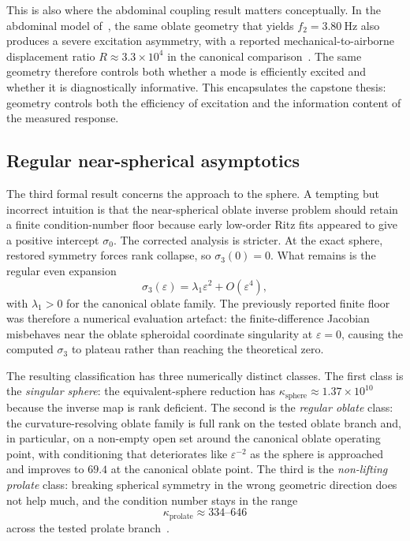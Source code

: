 This is also where the abdominal coupling result matters conceptually.  In the
abdominal model of~\cite{BrowntoneP1}, the same oblate geometry that yields
$f_2=\SI{3.80}{\hertz}$ also produces a severe excitation asymmetry, with a
reported mechanical-to-airborne displacement ratio
$R \approx 3.3\times 10^4$ in the canonical comparison~\cite{BrowntoneP1}.  The
same geometry therefore controls both whether a mode is efficiently excited and
whether it is diagnostically informative.  This encapsulates the capstone
thesis: geometry controls both the efficiency of excitation and the information
content of the measured response.

\subsection{Regular near-spherical asymptotics}

The third formal result concerns the approach to the sphere.  A tempting but
incorrect intuition is that the near-spherical oblate inverse problem should
retain a finite condition-number floor because early low-order Ritz fits
appeared to give a positive intercept $\sigma_0$.  The corrected analysis is
stricter.  At the exact sphere, restored symmetry forces rank collapse, so
$\sigma_3(0)=0$.  What remains is the regular even expansion
\begin{equation}
  \sigma_3(\varepsilon) = \lambda_1 \varepsilon^2 + O(\varepsilon^4),
\end{equation}
with $\lambda_1>0$ for the canonical oblate family.  The previously reported
finite floor was therefore a numerical evaluation artefact: the
finite-difference Jacobian misbehaves near the oblate spheroidal coordinate
singularity at $\varepsilon=0$, causing the computed $\sigma_3$ to plateau
rather than reaching the theoretical zero.

The resulting classification has three numerically distinct classes.  The first class is the
\emph{singular sphere}: the equivalent-sphere reduction has
$\kappa_\mathrm{sphere}\approx 1.37\times 10^{10}$ because the inverse map is
rank deficient.  The second is the \emph{regular oblate} class: the
curvature-resolving oblate family is full rank on the tested oblate branch and,
in particular, on a non-empty open set around the canonical oblate operating
point, with conditioning that deteriorates like $\varepsilon^{-2}$ as the
sphere is approached and improves to $69.4$ at the canonical oblate point.  The third is
the \emph{non-lifting prolate} class: breaking
spherical symmetry in the wrong geometric direction does not help much, and the
condition number stays in the range
\begin{equation}
  \kappa_\mathrm{prolate} \approx 334\text{--}646
\end{equation}
across the tested prolate branch~\cite{BrowntoneP8,BrowntoneP9}.

